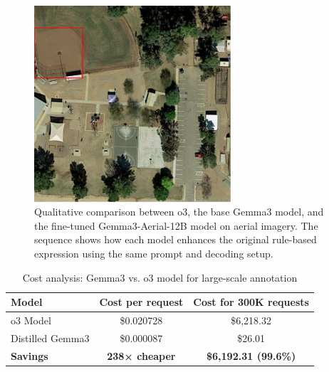 \begin{figure}[t]
\centering
\begin{minipage}{0.5\textwidth}
\centering
\includegraphics[width=0.65\textwidth]{Images/3llm.png}
\end{minipage}%
\begin{minipage}{0.5\textwidth}
\centering
\hspace{-1cm}
\end{minipage}
\caption{Qualitative comparison between o3, the base Gemma3 model, and the fine-tuned Gemma3-Aerial-12B model on aerial imagery. The sequence shows how each model enhances the original rule-based expression using the same prompt and decoding setup.}
\label{fig:distillation_comparison}
\end{figure}

\begin{table}[t]
\centering
\caption{Cost analysis: Gemma3 vs. o3 model for large-scale annotation}
\label{tab:cost_comparison}
\begin{tabular}{@{}lcc@{}}
\toprule
\textbf{Model} & \textbf{Cost per request} & \textbf{Cost for 300K requests} \\
\midrule
o3 Model & \$0.020728 & \$6{,}218.32 \\
Distilled Gemma3 & \$0.000087 & \$26.01 \\
\midrule
\textbf{Savings} & \textbf{238× cheaper} & \textbf{\$6{,}192.31 (99.6\%)} \\
\bottomrule
\end{tabular}
\end{table}

